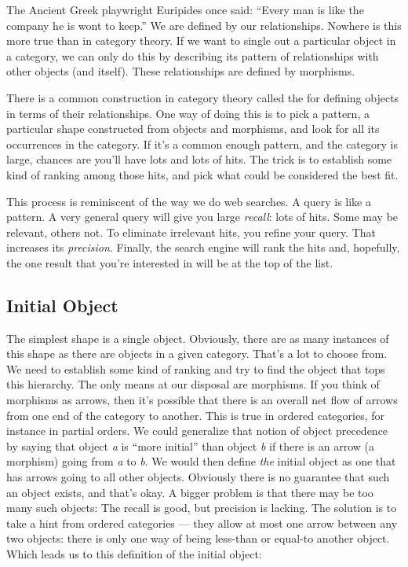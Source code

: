 The Ancient Greek playwright Euripides once said: ``Every man is like
the company he is wont to keep.'' We are defined by our relationships.
Nowhere is this more true than in category theory. If we want to single
out a particular object in a category, we can only do this by describing
its pattern of relationships with other objects (and itself). These
relationships are defined by morphisms.

There is a common construction in category theory called the
 for defining objects in terms of their
relationships. One way of doing this is to pick a pattern, a particular
shape constructed from objects and morphisms, and look for all its
occurrences in the category. If it's a common enough pattern, and the
category is large, chances are you'll have lots and lots of hits. The
trick is to establish some kind of ranking among those hits, and pick
what could be considered the best fit.

This process is reminiscent of the way we do web searches. A query is
like a pattern. A very general query will give you large \emph{recall}:
lots of hits. Some may be relevant, others not. To eliminate irrelevant
hits, you refine your query. That increases its \emph{precision}.
Finally, the search engine will rank the hits and, hopefully, the one
result that you're interested in will be at the top of the list.

\subsection{Initial Object}\label{initial-object}

The simplest shape is a single object. Obviously, there are as many
instances of this shape as there are objects in a given category. That's
a lot to choose from. We need to establish some kind of ranking and try
to find the object that tops this hierarchy. The only means at our
disposal are morphisms. If you think of morphisms as arrows, then it's
possible that there is an overall net flow of arrows from one end of the
category to another. This is true in ordered categories, for instance in
partial orders. We could generalize that notion of object precedence by
saying that object \emph{a} is ``more initial'' than object \emph{b} if
there is an arrow (a morphism) going from \emph{a} to \emph{b}. We would
then define \emph{the} initial object as one that has arrows going to
all other objects. Obviously there is no guarantee that such an object
exists, and that's okay. A bigger problem is that there may be too many
such objects: The recall is good, but precision is lacking. The solution
is to take a hint from ordered categories --- they allow at most one
arrow between any two objects: there is only one way of being less-than
or equal-to another object. Which leads us to this definition of the
initial object:

